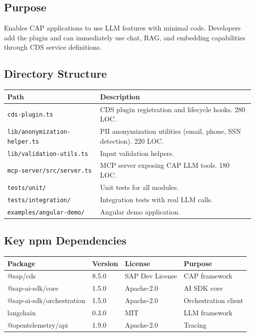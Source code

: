 \documentclass[11pt,a4paper]{article}
\begin{document}
\subsection{Purpose}

Enables CAP applications to use LLM features with minimal code. Developers add the plugin and can immediately use chat, RAG, and embedding capabilities through CDS service definitions.

\subsection{Directory Structure}

\begin{longtable}{@{}L{6cm}L{8cm}@{}}
\toprule
\textbf{Path} & \textbf{Description} \\
\midrule
\endhead
\texttt{cds-plugin.ts} & CDS plugin registration and lifecycle hooks. 280 LOC. \\
\texttt{lib/anonymization-helper.ts} & PII anonymization utilities (email, phone, SSN detection). 220 LOC. \\
\texttt{lib/validation-utils.ts} & Input validation helpers. \\
\texttt{mcp-server/src/server.ts} & MCP server exposing CAP LLM tools. 180 LOC. \\
\texttt{tests/unit/} & Unit tests for all modules. \\
\texttt{tests/integration/} & Integration tests with real LLM calls. \\
\texttt{examples/angular-demo/} & Angular demo application. \\
\bottomrule
\end{longtable}

\subsection{Key npm Dependencies}

\begin{longtable}{@{}L{4.5cm}L{2cm}L{2.5cm}L{4cm}@{}}
\toprule
\textbf{Package} & \textbf{Version} & \textbf{License} & \textbf{Purpose} \\
\midrule
\endhead
@sap/cds & 8.5.0 & SAP Dev License & CAP framework \\
@sap-ai-sdk/core & 1.5.0 & Apache-2.0 & AI SDK core \\
@sap-ai-sdk/orchestration & 1.5.0 & Apache-2.0 & Orchestration client \\
langchain & 0.3.0 & MIT & LLM framework \\
@opentelemetry/api & 1.9.0 & Apache-2.0 & Tracing \\
\bottomrule
\end{longtable}
\end{document}
